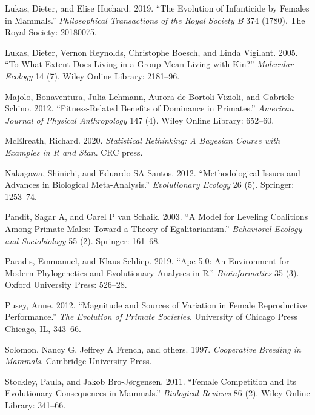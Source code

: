 \documentclass[]{article}
\begin{document}
\leavevmode\hypertarget{ref-lukas2019evolution}{}%
Lukas, Dieter, and Elise Huchard. 2019. ``The Evolution of Infanticide
by Females in Mammals.'' \emph{Philosophical Transactions of the Royal
Society B} 374 (1780). The Royal Society: 20180075.

\leavevmode\hypertarget{ref-lukas2005extent}{}%
Lukas, Dieter, Vernon Reynolds, Christophe Boesch, and Linda Vigilant.
2005. ``To What Extent Does Living in a Group Mean Living with Kin?''
\emph{Molecular Ecology} 14 (7). Wiley Online Library: 2181--96.

\leavevmode\hypertarget{ref-majolo2012fitness}{}%
Majolo, Bonaventura, Julia Lehmann, Aurora de Bortoli Vizioli, and
Gabriele Schino. 2012. ``Fitness-Related Benefits of Dominance in
Primates.'' \emph{American Journal of Physical Anthropology} 147 (4).
Wiley Online Library: 652--60.

\leavevmode\hypertarget{ref-mcelreath2020statistical}{}%
McElreath, Richard. 2020. \emph{Statistical Rethinking: A Bayesian
Course with Examples in R and Stan}. CRC press.

\leavevmode\hypertarget{ref-nakagawa2012methodological}{}%
Nakagawa, Shinichi, and Eduardo SA Santos. 2012. ``Methodological Issues
and Advances in Biological Meta-Analysis.'' \emph{Evolutionary Ecology}
26 (5). Springer: 1253--74.

\leavevmode\hypertarget{ref-pandit2003model}{}%
Pandit, Sagar A, and Carel P van Schaik. 2003. ``A Model for Leveling
Coalitions Among Primate Males: Toward a Theory of Egalitarianism.''
\emph{Behavioral Ecology and Sociobiology} 55 (2). Springer: 161--68.

\leavevmode\hypertarget{ref-paradis2019ape}{}%
Paradis, Emmanuel, and Klaus Schliep. 2019. ``Ape 5.0: An Environment
for Modern Phylogenetics and Evolutionary Analyses in R.''
\emph{Bioinformatics} 35 (3). Oxford University Press: 526--28.

\leavevmode\hypertarget{ref-pusey2012magnitude}{}%
Pusey, Anne. 2012. ``Magnitude and Sources of Variation in Female
Reproductive Performance.'' \emph{The Evolution of Primate Societies}.
University of Chicago Press Chicago, IL, 343--66.

\leavevmode\hypertarget{ref-solomon1997cooperative}{}%
Solomon, Nancy G, Jeffrey A French, and others. 1997. \emph{Cooperative
Breeding in Mammals}. Cambridge University Press.

\leavevmode\hypertarget{ref-stockley2011female}{}%
Stockley, Paula, and Jakob Bro-Jørgensen. 2011. ``Female Competition and
Its Evolutionary Consequences in Mammals.'' \emph{Biological Reviews} 86
(2). Wiley Online Library: 341--66.
\end{document}
